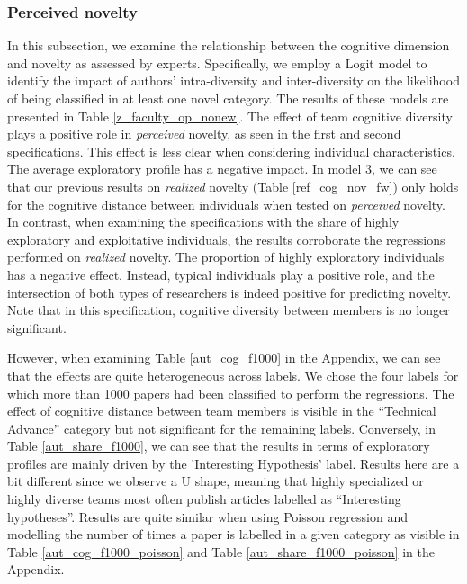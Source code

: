 \subsubsection{Perceived novelty}
In this subsection, we examine the relationship between the cognitive dimension and novelty as assessed by experts. Specifically, we employ a Logit model to identify the impact of authors' intra-diversity and inter-diversity on the likelihood of being classified in at least one novel category. The results of these models are presented in Table \ref{z_faculty_op_nonew}. The effect of team cognitive diversity plays a positive role in \textit{perceived} novelty, as seen in the first and second specifications. This effect is less clear when considering individual characteristics. The average exploratory profile has a negative impact. In model 3, we can see that our previous results on \textit{realized} novelty (Table \ref{ref_cog_nov_fw}) only holds for the cognitive distance between individuals when tested on \textit{perceived} novelty. In contrast, when examining the specifications with the share of highly exploratory and exploitative individuals, the results corroborate the regressions performed on \textit{realized} novelty. The proportion of highly exploratory individuals has a negative effect. Instead, typical individuals play a positive role, and the intersection of both types of researchers is indeed positive for predicting novelty. Note that in this specification, cognitive diversity between members is no longer significant.



However, when examining Table \ref{aut_cog_f1000} in the Appendix, we can see that the effects are quite heterogeneous across labels. We chose the four labels for which more than 1000 papers had been classified to perform the regressions. The effect of cognitive distance between team members is visible in the ``Technical Advance'' category but not significant for the remaining labels. Conversely, in Table \ref{aut_share_f1000}, we can see that the results in terms of exploratory profiles are mainly driven by the 'Interesting Hypothesis' label. Results here are a bit different since we observe a U shape, meaning that highly specialized or highly diverse teams most often publish articles labelled as ``Interesting hypotheses''. Results are quite similar when using Poisson regression and modelling the number of times a paper is labelled in a given category as visible in Table \ref{aut_cog_f1000_poisson} and Table \ref{aut_share_f1000_poisson} in the Appendix.

